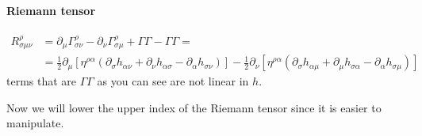 \paragraph{Riemann tensor}
\begin{align}
	R^{\rho }_{\sigma \mu \nu } &= \partial_{\mu }\Gamma ^{\rho }_{\sigma \nu } - \partial_{\nu }\Gamma ^{\rho }_{\sigma \mu } + \Gamma \Gamma -\Gamma \Gamma  = \\
				    &= \frac{1}{2} \partial_{\mu } \left[ \eta ^{\rho \alpha }\left( \partial_{\sigma} h_{\alpha \nu }+ \partial_{\nu }h_{\alpha \sigma }- \partial_{\alpha }h_{\sigma \nu } \right) \right] - \frac{1}{2}\partial_{\nu }\left[ \eta ^{\rho \alpha }\left( \partial_{\sigma }h_{\alpha \mu } +\partial_{\mu }h_{\sigma \alpha }- \partial_{\alpha }h_{\sigma \mu } \right) \right] 
\end{align}
terms that are $\Gamma \Gamma $ as you can see are not linear in $h$.\par
Now we will lower the upper index of the Riemann tensor since it is easier to manipulate.
























